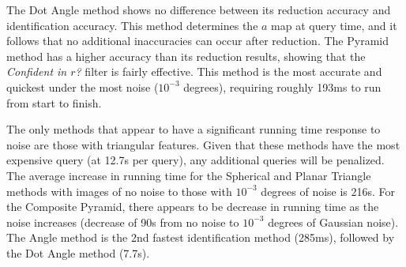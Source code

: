 The Dot Angle method shows no difference between its reduction accuracy and identification accuracy.
This method determines the $a$ map at query time, and it follows that no additional inaccuracies can occur after
reduction.
The Pyramid method has a higher accuracy than its reduction results, showing that the \textit{Confident in $r$?} filter
is fairly effective.
This method is the most accurate and quickest under the most noise ($10^{-3}$ degrees), requiring roughly 193ms to
run from start to finish.

The only methods that appear to have a significant running time response to noise are those with triangular features.
Given that these methods have the most expensive query (at 12.7s per query), any additional queries will be penalized.
The average increase in running time for the Spherical and Planar Triangle methods with images of no noise to those with
$10^{-3}$ degrees of noise is 216s.
For the Composite Pyramid, there appears to be decrease in running time as the noise increases (decrease of 90s from
no noise to $10^{-3}$ degrees of Gaussian noise).
The Angle method is the 2nd fastest identification method (285ms), followed by the Dot Angle method (7.7s).

%
%
%

